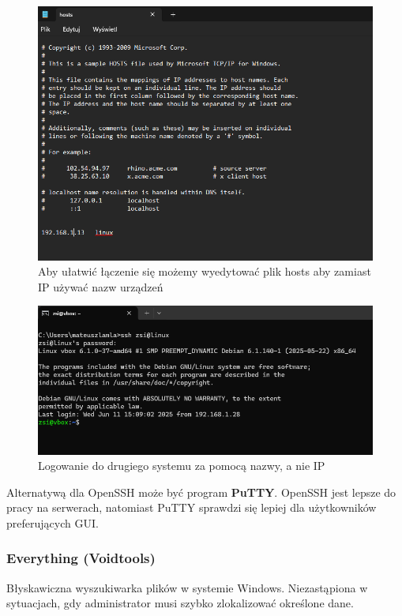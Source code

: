 \documentclass[0.82pt,a4paper]{article}
\begin{document}
    \begin{figure}[H]
        \centering
        \includegraphics[width=0.8\linewidth]{media/OpenSSH/6_edycja_hosts.png}
        \caption[edycja hosts ssh]{Aby ułatwić łączenie się możemy wyedytować plik hosts aby zamiast IP używać nazw urządzeń}
        \label{fig:ssh_edycja_hosts}
    \end{figure}

    \begin{figure}[H]
        \centering
        \includegraphics[width=0.8\linewidth]{media/OpenSSH/7_logowanie_po_nazwie_a_nie_po_ip.png}
        \caption[Logowanie po nazwie ssh]{Logowanie do drugiego systemu za pomocą nazwy, a nie IP}
        \label{fig:logowanie_nazwa}
    \end{figure}
    
    Alternatywą dla OpenSSH może być program \textbf{PuTTY}. OpenSSH jest lepsze do pracy na serwerach, natomiast PuTTY sprawdzi się lepiej dla użytkowników preferujących GUI.
\newpage
\subsubsection{Everything (Voidtools)}
    Błyskawiczna wyszukiwarka plików w systemie Windows. Niezastąpiona w sytuacjach, gdy administrator musi szybko zlokalizować określone dane.
    
\end{document}
